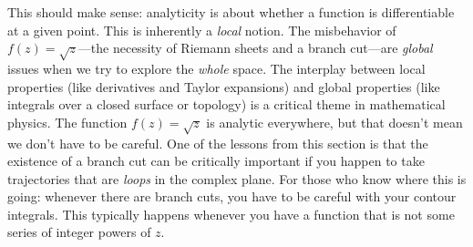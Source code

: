 This should make sense: analyticity is about whether a function is differentiable at a given point. This is inherently a \emph{local} notion. The misbehavior of $f(z)=\sqrt{z}$---the necessity of Riemann sheets and a branch cut---are \emph{global} issues when we try to explore the \emph{whole} space. The interplay between local properties (like derivatives and Taylor expansions) and global properties (like integrals over a closed surface or topology) is a critical theme in mathematical physics. The function $f(z) = \sqrt{z}$ is analytic everywhere, but that doesn't mean we don't have to be careful. One of the lessons from this section is that the existence of a branch cut can be critically important if you happen to take trajectories that are \emph{loops} in the complex plane. For those who know where this is going: whenever there are branch cuts, you have to be careful with your contour integrals. This typically happens whenever you have a function that is not some series of integer powers of $z$.

